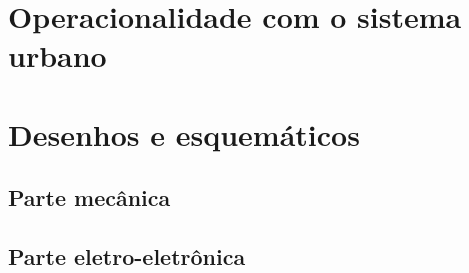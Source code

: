 \section{Operacionalidade com o sistema urbano}
\label{sec:operac}
\lipsum[2-4]




\section{Desenhos e esquemáticos}
\label{sec:desenhos}
\lipsum[2-4]



\subsection{Parte mecânica}
\label{ssec:mec}
\lipsum[2-4]




\subsection{Parte eletro-eletrônica}
\label{ssec:elet}
\lipsum[2-4]

